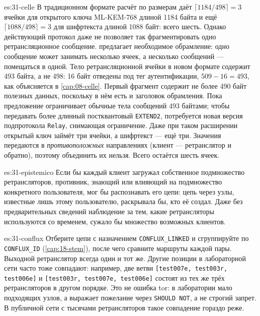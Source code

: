 \begin{soluzione}{es:31-celle}
В традиционном формате расчёт по размерам даёт $\lceil 1184/498 \rceil = 3$ ячейки для открытого ключа ML-KEM-768 длиной 1184 байта и ещё $\lceil 1088/498 \rceil = 3$ для шифртекста длиной 1088 байт: всего шесть. Однако действующий протокол даже не позволяет так фрагментировать одно ретрансляционное сообщение.  предлагает необходимое обрамление: одно сообщение может занимать несколько ячеек, а несколько сообщений — помещаться в одной. Тело ретрансляционной ячейки в новом формате содержит 493 байта, а не 498: 16 байт отведены под тег аутентификации, $509 - 16 = 493$, как объясняется в \cref{cap:08-celle}. Первый фрагмент содержит не более 490 байт полезных данных, поскольку в нём есть и заголовок обрамления. Пока предложение ограничивает обычные тела сообщений 493 байтами; чтобы передавать более длинный постквантовый \texttt{EXTEND2}, потребуется новая версия подпротокола \texttt{Relay}, снимающая ограничение. Даже при таком расширении открытый ключ займёт три ячейки, а шифртекст — ещё три. Значения передаются в \emph{противоположных} направлениях (клиент — ретранслятор и обратно), поэтому объединить их нельзя. Всего остаётся шесть ячеек.
\end{soluzione}

\begin{soluzione}{es:31-epistemico}
Если бы каждый клиент загружал собственное подмножество ретрансляторов, противник, знающий или влияющий на подмножество конкретного пользователя, мог бы распознавать его цепи: цепь через узлы, известные лишь этому пользователю, раскрывала бы, кто её создал. Даже без предварительных сведений наблюдение за тем, какие ретрансляторы используются со временем, сужало бы множество возможных клиентов.
\end{soluzione}

\begin{soluzione}{es:31-conflux}
Отберите цепи с назначением \texttt{CONFLUX\_LINKED} и сгруппируйте по \texttt{CONFLUX\_ID} (\cref{cap:18-stem}), после чего сравните маршруты каждой пары. Выходной ретранслятор всегда один и тот же. Другие позиции в лабораторной сети часто тоже совпадают: например, две ветви \texttt{[test007e, test003r, test006e]} и \texttt{[test003r, test007e, test006e]} состоят из тех же трёх ретрансляторов в другом порядке. Это не ошибка tor: в лаборатории мало подходящих узлов, а  выражает пожелание через \texttt{SHOULD NOT}, а не строгий запрет. В публичной сети с тысячами ретрансляторов такое совпадение гораздо реже.
\end{soluzione}

